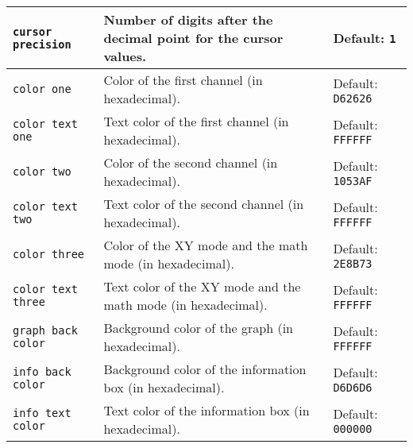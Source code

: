 \documentclass[11pt,a4paper,usenames,dvipsnames]{article}
\begin{document}
\begin{tcolorbox}[enhanced,breakable,colback=white,colframe=black,width=\textwidth,left=0mm,right=0mm,top=0mm,bottom=0mm,boxsep=0mm]
\begin{tabular}{p{}|p{}|p{}}
        \texttt{cursor precision}      & Number of digits after the decimal point for the cursor values.                                                        & Default: \texttt{1}                                             \\\hline
        \texttt{color one}             & Color of the first channel (in hexadecimal).                                                                           & Default: \texttt{D62626}                                        \\\hline
        \texttt{color text one}        & Text color of the first channel (in hexadecimal).                                                                      & Default: \texttt{FFFFFF}                                        \\\hline
        \texttt{color two}             & Color of the second channel (in hexadecimal).                                                                          & Default: \texttt{1053AF}                                        \\\hline
        \texttt{color text two}        & Text color of the second channel (in hexadecimal).                                                                     & Default: \texttt{FFFFFF}                                        \\\hline
        \texttt{color three}           & Color of the XY mode and the math mode (in hexadecimal).                                                               & Default: \texttt{2E8B73}                                        \\\hline
        \texttt{color text three}      & Text color of the XY mode and the math mode (in hexadecimal).                                                          & Default: \texttt{FFFFFF}                                        \\\hline
        \texttt{graph back color}      & Background color of the graph (in hexadecimal).                                                                        & Default: \texttt{FFFFFF}                                        \\\hline
        \texttt{info back color}       & Background color of the information box (in hexadecimal).                                                              & Default: \texttt{D6D6D6}                                        \\\hline
        \texttt{info text color}       & Text color of the information box (in hexadecimal).                                                                    & Default: \texttt{000000}                                        \\\hline

\end{tabular}
\end{tcolorbox}
\end{document}
